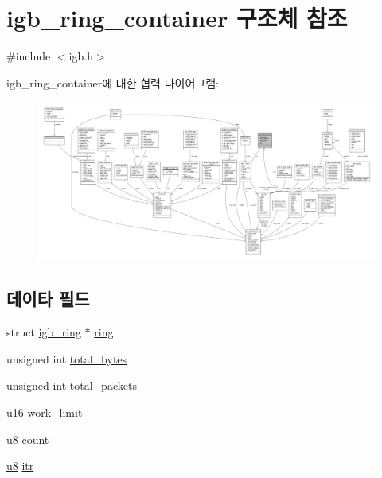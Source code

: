 \hypertarget{structigb__ring__container}{}\section{igb\+\_\+ring\+\_\+container 구조체 참조}
\label{structigb__ring__container}


{\ttfamily \#include $<$igb.\+h$>$}



igb\+\_\+ring\+\_\+container에 대한 협력 다이어그램\+:
\nopagebreak
\begin{figure}[H]
\begin{center}
\leavevmode
\includegraphics[width=350pt]{structigb__ring__container__coll__graph}
\end{center}
\end{figure}
\subsection*{데이타 필드}
\begin{DoxyCompactItemize}
\item 
struct \hyperlink{structigb__ring}{igb\+\_\+ring} $\ast$ \hyperlink{structigb__ring__container_a7ff435d2a0df26392bb30a9c2892c97b}{ring}
\item 
unsigned int \hyperlink{structigb__ring__container_a3ba0a002e956c88f2433d97977c92b59}{total\+\_\+bytes}
\item 
unsigned int \hyperlink{structigb__ring__container_a6faab394a49c8462592c339de9d60855}{total\+\_\+packets}
\item 
\hyperlink{lib_2igb_2e1000__osdep_8h_acdc9cf0314be0ae5a01d6d4379a95edd}{u16} \hyperlink{structigb__ring__container_a2b47c2bd8dc8cbb82489685b42113cb2}{work\+\_\+limit}
\item 
\hyperlink{lib_2igb_2e1000__osdep_8h_a8baca7e76da9e0e11ce3a275dd19130c}{u8} \hyperlink{structigb__ring__container_a7906e924925f78f27079e8aed507dc09}{count}
\item 
\hyperlink{lib_2igb_2e1000__osdep_8h_a8baca7e76da9e0e11ce3a275dd19130c}{u8} \hyperlink{structigb__ring__container_ab2e0be8050c2da59d1821499950a92d7}{itr}
\end{DoxyCompactItemize}


